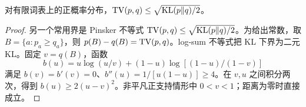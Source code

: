 \begin{theorem}
对有限词表上的正概率分布，$\operatorname{TV}(p,q)\le\sqrt{\operatorname{KL}(p\Vert q)/2}$。
\end{theorem}
\begin{proof}
另一个常用界是 Pinsker 不等式 $\operatorname{TV}(p,q)\le\sqrt{\operatorname{KL}(p\Vert q)/2}$。为给出常数，取 $B=\{a:p_a\ge q_a\}$，则 $p(B)-q(B)=\operatorname{TV}(p,q)$。log-sum 不等式把 KL 下界为二元 KL。固定 $v=q(B)$，函数
\begin{equation}
b(u)=u\log(u/v)+(1-u)\log[(1-u)/(1-v)]
\end{equation}
满足 $b(v)=b'(v)=0$、$b''(u)=1/[u(1-u)]\ge4$。在 $v,u$ 之间积分两次，得到 $b(u)\ge2(u-v)^2$。非平凡正支持情形中 $0<v<1$；距离为零时直接成立。
\end{proof}
